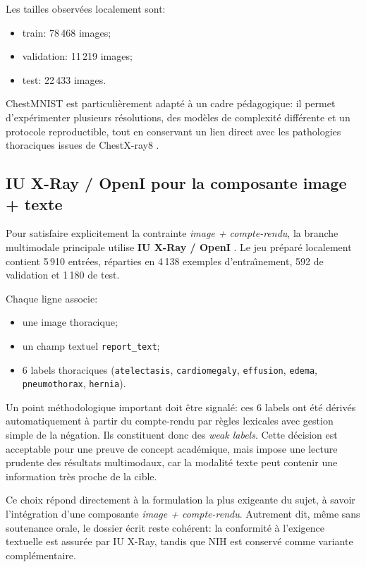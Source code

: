 \documentclass[11pt,a4paper]{article}
\begin{document}
Les tailles observ\'ees localement sont:
\begin{itemize}
    \item train: 78\,468 images;
    \item validation: 11\,219 images;
    \item test: 22\,433 images.
\end{itemize}

ChestMNIST est particuli\`erement adapt\'e \`a un cadre p\'edagogique: il permet d'exp\'erimenter plusieurs r\'esolutions, des mod\`eles de complexit\'e diff\'erente et un protocole reproductible, tout en conservant un lien direct avec les pathologies thoraciques issues de ChestX-ray8 \cite{wang2017chestxray8}.

\subsection{IU X-Ray / OpenI pour la composante image + texte}
Pour satisfaire explicitement la contrainte \emph{image + compte-rendu}, la branche multimodale principale utilise \textbf{IU X-Ray / OpenI} \cite{demnerfushman2016openi}. Le jeu pr\'epar\'e localement contient 5\,910 entr\'ees, r\'eparties en 4\,138 exemples d'entra\^\i nement, 592 de validation et 1\,180 de test.

Chaque ligne associe:
\begin{itemize}
    \item une image thoracique;
    \item un champ textuel \texttt{report\_text};
    \item 6 labels thoraciques (\texttt{atelectasis}, \texttt{cardiomegaly}, \texttt{effusion}, \texttt{edema}, \texttt{pneumothorax}, \texttt{hernia}).
\end{itemize}

Un point m\'ethodologique important doit \^etre signal\'e: ces 6 labels ont \'et\'e d\'eriv\'es automatiquement \`a partir du compte-rendu par r\`egles lexicales avec gestion simple de la n\'egation. Ils constituent donc des \emph{weak labels}. Cette d\'ecision est acceptable pour une preuve de concept acad\'emique, mais impose une lecture prudente des r\'esultats multimodaux, car la modalit\'e texte peut contenir une information tr\`es proche de la cible.

Ce choix r\'epond directement \`a la formulation la plus exigeante du sujet, \`a savoir l'int\'egration d'une composante \emph{image + compte-rendu}. Autrement dit, m\^eme sans soutenance orale, le dossier \'ecrit reste coh\'erent: la conformit\'e \`a l'exigence textuelle est assur\'ee par IU X-Ray, tandis que NIH est conserv\'e comme variante compl\'ementaire.
\end{document}
